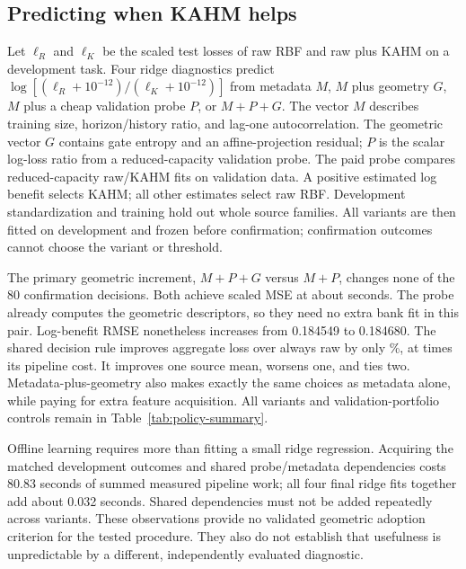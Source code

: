 \subsection{Predicting when KAHM helps}
Let $\ell_R$ and $\ell_K$ be the scaled test losses of raw RBF and
raw plus KAHM on a development task. Four ridge diagnostics predict
$\log[(\ell_R+10^{-12})/(\ell_K+10^{-12})]$ from metadata $M$,
$M$ plus geometry $G$, $M$ plus a cheap validation probe $P$, or $M+P+G$.
The vector $M$ describes training size, horizon/history ratio, and
lag-one autocorrelation. The geometric vector $G$ contains gate entropy
and an affine-projection residual; $P$ is the scalar log-loss ratio
from a reduced-capacity validation probe. The paid probe compares reduced-capacity raw/KAHM fits on
validation data. A positive estimated log benefit selects KAHM; all other estimates
select raw RBF. Development standardization and training hold out whole source
families. All variants are then fitted on development and frozen before
confirmation; confirmation outcomes cannot choose the variant or threshold.

The primary geometric increment, $M+P+G$ versus $M+P$, changes none of
the 80 confirmation decisions. Both achieve scaled MSE
\NaturalProbeLoss{} at about \NaturalProbeCost{} seconds. The probe already
computes the geometric descriptors, so they need no extra bank fit in this
pair. Log-benefit RMSE nonetheless increases from 0.184549 to 0.184680.
The shared decision rule improves aggregate loss over always raw by only
\NaturalProbeGainPercent\%, at \NaturalProbeCostRatio{} times its pipeline
cost. It improves one source mean, worsens one, and ties two.
Metadata-plus-geometry also makes exactly the same choices as metadata
alone, while paying for extra feature acquisition. All variants and
validation-portfolio controls remain in Table~\ref{tab:policy-summary}.

Offline learning requires more than fitting a small ridge regression.
Acquiring the matched development outcomes and shared probe/metadata
dependencies costs 80.83 seconds of summed measured pipeline work;
all four final ridge fits together add about 0.032 seconds. Shared
dependencies must not be added repeatedly across variants. These
observations provide no validated geometric adoption criterion for the
tested procedure. They also do not establish that usefulness is
unpredictable by a different, independently evaluated diagnostic.
